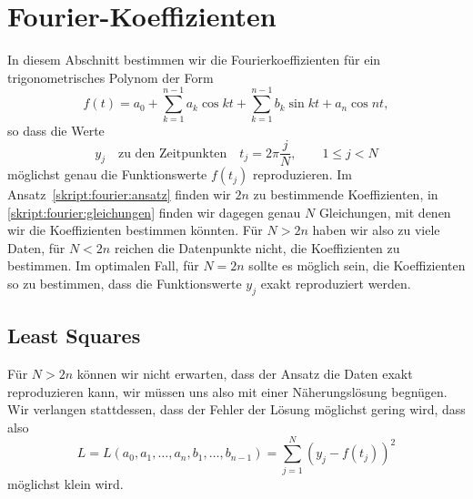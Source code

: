 %
%
%
\section{Fourier-Koeffizienten}
In diesem Abschnitt
bestimmen wir die Fourierkoeffizienten für ein trigonometrisches Polynom
der Form
\begin{equation}
f(t)
=
a_0 + \sum_{k=1}^{n-1} a_k\cos kt + \sum_{k=1}^{n-1} b_k\sin kt + a_n\cos nt,
\label{skript:fourier:ansatz}
\end{equation}
so dass die Werte
\begin{equation}
y_j \quad\text{zu den Zeitpunkten}\quad t_j=2\pi\frac{j}{N},\qquad 1\le j< N
\label{skript:fourier:gleichungen}
\end{equation}
möglichst genau die Funktionswerte $f(t_j)$ reproduzieren.
Im Ansatz~\eqref{skript:fourier:ansatz} finden wir $2n$ zu bestimmende 
Koeffizienten, in \eqref{skript:fourier:gleichungen} finden wir dagegen
genau $N$ Gleichungen, mit denen wir die Koeffizienten bestimmen könnten.
Für $N>2n$ haben wir also zu viele Daten, für $N<2n$ reichen die Datenpunkte
nicht, die Koeffizienten zu bestimmen.
Im optimalen Fall, für $N=2n$ sollte es möglich sein, die Koeffizienten so
zu bestimmen, dass die Funktionswerte $y_j$ exakt reproduziert werden.

\subsection{Least Squares}
Für $N>2n$ können wir nicht erwarten, dass der Ansatz die Daten
exakt reproduzieren kann, wir müssen uns also mit einer
Näherungslösung begnügen.
Wir verlangen stattdessen, dass der Fehler der Lösung möglichst gering
wird, dass also
\[
L=L(a_0,a_1,\dots,a_n,b_1,\dots,b_{n-1})= \sum_{j=1}^N (y_j - f(t_j))^2
\]
möglichst klein wird.

